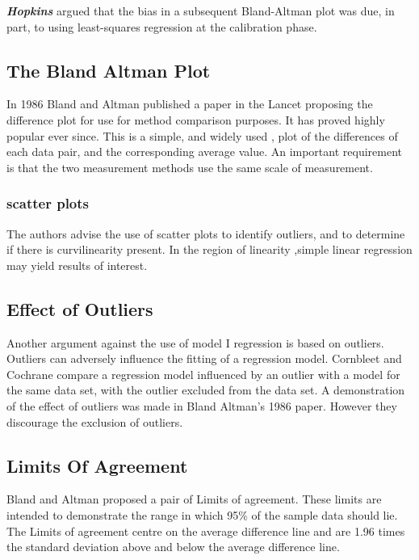\documentclass{report}
\begin{document}
\textbf{\textit{Hopkins}} argued that the bias in a subsequent Bland-Altman plot was
due, in part, to using least-squares regression at the calibration
phase.


\subsection{The Bland Altman Plot}
In 1986 Bland and Altman published a paper in the Lancet proposing
the difference plot for use for method comparison purposes. It has
proved highly popular ever since. This is a simple, and widely
used , plot of the differences of each data pair, and the
corresponding average value. An important requirement is that the
two measurement methods use the same scale of measurement.

\subsubsection{scatter plots} The authors advise the
use of scatter plots to identify outliers, and to determine if
there is curvilinearity present. In the region of linearity
,simple linear regression may yield results of interest.

\subsection{Effect of Outliers} Another argument against
the use of model I regression is based on outliers. Outliers can
adversely influence the fitting of a regression model. Cornbleet
and Cochrane compare a regression model influenced by an outlier
with a model for the same data set, with the outlier excluded from
the data set. A demonstration of the effect of outliers was made
in Bland Altman's 1986 paper. However they discourage the
exclusion of outliers.

\subsection{Limits Of Agreement}
Bland and Altman proposed a pair of Limits of agreement. These
limits are intended to demonstrate the range in which 95\% of the
sample data should lie. The Limits of agreement centre on the
average difference line and are 1.96 times the standard deviation
above and below the average difference line.
\end{document}
